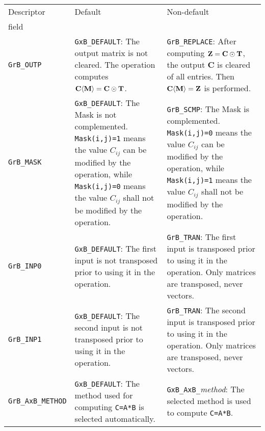 \documentclass[12pt]{article}
\begin{document}
\vspace{0.2in}
\noindent
{\small
\begin{tabular}{|l|p{2.4in}|p{2.2in}|}
\hline
Descriptor & Default   & Non-default \\
field      & &  \\
\hline

\verb'GrB_OUTP'
    & \verb'GxB_DEFAULT':
    The output matrix is not cleared.  The operation computes
    ${\bf C \langle M \rangle = C \odot T}$.
    & \verb'GrB_REPLACE':
    After computing ${\bf Z=C\odot T}$,
    the output {\bf C} is cleared of all entries.
    Then ${\bf C \langle M \rangle = Z}$ is performed. \\

\hline

\verb'GrB_MASK'
    & \verb'GxB_DEFAULT':
    The Mask is not complemented.  \verb'Mask(i,j)=1' means the value $C_{ij}$
    can be modified by the operation, while \verb'Mask(i,j)=0' means the value
    $C_{ij}$ shall not be modified by the operation.
    & \verb'GrB_SCMP':
    The Mask is complemented.  \verb'Mask(i,j)=0' means the value $C_{ij}$
    can be modified by the operation, while \verb'Mask(i,j)=1' means the value
    $C_{ij}$ shall not be modified by the operation. \\

\hline

\verb'GrB_INP0'
    & \verb'GxB_DEFAULT':
    The first input is not transposed prior to using it in the operation.
    & \verb'GrB_TRAN':
    The first input is transposed prior to using it in the operation.  Only
    matrices are transposed, never vectors. \\

\hline

\verb'GrB_INP1'
    & \verb'GxB_DEFAULT':
    The second input is not transposed prior to using it in the operation.
    & \verb'GrB_TRAN':
    The second input is transposed prior to using it in the operation.  Only
    matrices are transposed, never vectors. \\

\hline

\verb'GrB_AxB_METHOD'
    & \verb'GxB_DEFAULT':
    The method used for computing \verb'C=A*B' is selected automatically.
    & \verb'GxB_AxB_'{\em method}: The selected method is used to compute
    \verb'C=A*B'.  \\

\hline
\end{tabular}
}
\end{document}
